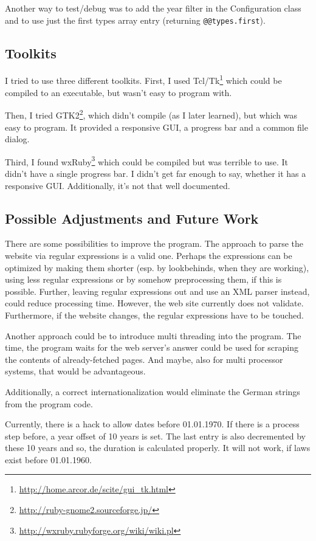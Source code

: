 \documentclass{scrartcl}
\begin{document}
Another way to test/debug was to add the year filter in the Configuration class and to use just the first types array entry (returning \texttt{@@types.first}).



\subsection{Toolkits}
\label{Toolkits}
I tried to use three different toolkits. First, I used Tcl/Tk\footnote{\url{http://home.arcor.de/scite/gui_tk.html}} which could be compiled to an executable, but wasn't easy to program with.

Then, I tried GTK2\footnote{\url{http://ruby-gnome2.sourceforge.jp/}}, which didn't compile (as I later learned), but which was easy to program. It provided a responsive GUI, a progress bar and a common file dialog.

Third, I found wxRuby\footnote{\url{http://wxruby.rubyforge.org/wiki/wiki.pl}} which could be compiled but was terrible to use. It didn't have a single progress bar. I didn't get far enough to say, whether it has a responsive GUI. Additionally, it's not that well documented.



\subsection{Possible Adjustments and Future Work}
There are some possibilities to improve the program. The approach to parse the website via regular expressions is a valid one. Perhaps the expressions can be optimized by making them shorter (esp. by lookbehinds, when they are working), using less regular expressions or by somehow preprocessing them, if this is possible. Further, leaving regular expressions out and use an XML parser instead, could reduce processing time. However, the web site currently does not validate. Furthermore, if the website changes, the regular expressions have to be touched.

Another approach could be to introduce multi threading into the program. The time, the program waits for the web server's answer could be used for scraping the contents of already-fetched pages. And maybe, also for multi processor systems, that would be advantageous.

Additionally, a correct internationalization would eliminate the German strings from the program code.

Currently, there is a hack to allow dates before 01.01.1970. If there is a process step before, a year offset of 10 years is set. The last entry is also decremented by these 10 years and so, the duration is calculated properly. It will not work, if laws exist before 01.01.1960.
\end{document}
